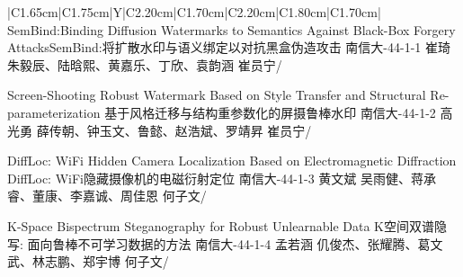 \Needspace{7.5cm}
\begin{tabularx}{\textwidth}{|C{1.65cm}|C{1.75cm}|Y|C{2.20cm}|C{1.70cm}|C{2.20cm}|C{1.80cm}|C{1.70cm}|}
\HeaderRow
{}
{SemBind:Binding Diffusion Watermarks to Semantics Against Black-Box Forgery Attacks\newline SemBind:将扩散水印与语义绑定以对抗黑盒伪造攻击}
{南信大-44-1-1}
{崔琦}
{朱毅辰、陆晗熙、黄嘉乐、丁欣、袁韵涵}
{崔员宁}{/}

{Screen-Shooting Robust Watermark Based on Style Transfer and Structural Re-parameterization    \newline  基于风格迁移与结构重参数化的屏摄鲁棒水印}
{南信大-44-1-2}
{高光勇}
{薛传朝、钟玉文、鲁懿、赵浩斌、罗靖昇}
{崔员宁}{/}


{DiffLoc: WiFi Hidden Camera Localization Based on Electromagnetic Diffraction     \newline  DiffLoc: WiFi隐藏摄像机的电磁衍射定位}
{南信大-44-1-3}
{黄文斌}
{吴雨健、蒋承睿、董康、李嘉诚、周佳恩}
{何子文}{/}

{K-Space Bispectrum Steganography for Robust Unlearnable Data \newline K空间双谱隐写: 面向鲁棒不可学习数据的方法}
{南信大-44-1-4}
{孟若涵}
{仉俊杰、张耀腾、葛文武、林志鹏、郑宇博}
{何子文}{/}
\end{tabularx}
\BlockGap



